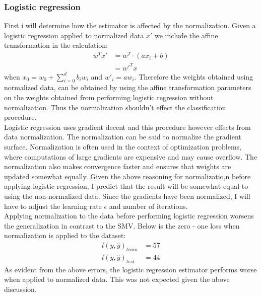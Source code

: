 \documentclass{article}
\begin{document}
\subsubsection{Logistic regression}
First i will determine how the estimator is affected by the normalization. Given a logistic regression applied to normalized data $ x'$ we include the affine transformation in the calculation:
\begin{align*}
w^Tx' &= w^T \cdot (a x_i +b) \\
&= w'^Tx
\end{align*}
when $x_0 = w_0 + \sum_{i=0}^d b_i w_i$ and $ w'_i = a w_i$. Therefore the weights obtained using normalized data, can be obtained by using the affine transformation parameters on the weights obtained from performing logistic regression without normalization. Thus the normalization shouldn't effect the classification procedure. \\
Logistic regression uses gradient decent and this procedure however effects from data normalization. The normalization can be said to normalize the gradient surface. Normalization is often  used in the context of optimization problems, where computations of large gradients are expensive and may cause overflow. The normalization also makes convergence faster and ensures that weights are updated somewhat equally. Given the above reasoning for normalizatio,n before applying logistic regression, I predict that the result will be somewhat equal to using the non-normalized data. Since the gradients have been normalized, I will have to adjust the learning rate $\epsilon$ and number of iterations. \\
Applying normalization to the data before performing logistic regression worsens the generalization in contrast to the SMV. Below is the zero - one loss when normalization is applied to the dataset:
\begin{align*}
l(y,\hat{y})_{train} &= 57\\
l(y,\hat{y})_{test} &= 44
\end{align*}
As evident from the above errors, the logistic regression estimator performs worse when applied to normalized data. This was not expected given the above discussion.
\end{document}
